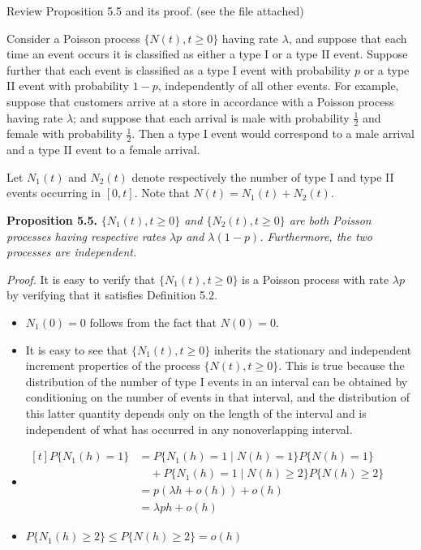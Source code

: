 \documentclass[12pt,a4paper]{article}
\begin{document}
Review Proposition 5.5 and its proof. (see the file attached)

Consider a Poisson process $\{N(t), t \ge 0\}$ having rate $\lambda$, and suppose that each time an event occurs it is classified as either a type I or a type II event. Suppose further that each event is classified as a type I event with probability $p$ or a type II event with probability $1-p$, independently of all other events. For example, suppose that customers arrive at a store in accordance with a Poisson process having rate $\lambda$; and suppose that each arrival is male with probability $\frac{1}{2}$ and female with probability $\frac{1}{2}$. Then a type I event would correspond to a male arrival and a type II event to a female arrival.

Let $N_1(t)$ and $N_2(t)$ denote respectively the number of type I and type II events occurring in $[0,t]$. Note that $N(t)=N_1(t)+N_2(t)$.

\noindent\textbf{Proposition 5.5.} \textit{$\{N_1(t), t \ge 0\}$ and $\{N_2(t), t \ge 0\}$ are both Poisson processes having respective rates $\lambda p$ and $\lambda(1-p)$. Furthermore, the two processes are independent.}

\noindent\textit{Proof.} It is easy to verify that $\{N_1(t), t \ge 0\}$ is a Poisson process with rate $\lambda p$ by verifying that it satisfies Definition 5.2.

\begin{itemize}[leftmargin=2em]
  \item $N_1(0)=0$ follows from the fact that $N(0)=0$.
  \item It is easy to see that $\{N_1(t), t \ge 0\}$ inherits the stationary and independent increment properties of the process $\{N(t), t \ge 0\}$. This is true because the distribution of the number of type I events in an interval can be obtained by conditioning on the number of events in that interval, and the distribution of this latter quantity depends only on the length of the interval and is independent of what has occurred in any nonoverlapping interval.
  \item
  $\begin{aligned}[t]
    P\{N_1(h)=1\}
      &=P\{N_1(h)=1\mid N(h)=1\}P\{N(h)=1\}\\
      &\quad+P\{N_1(h)=1\mid N(h)\ge 2\}P\{N(h)\ge 2\}\\
      &=p(\lambda h+o(h))+o(h)\\
      &=\lambda ph+o(h)
  \end{aligned}$
  \item $P\{N_1(h)\ge 2\}\le P\{N(h)\ge 2\}=o(h)$
\end{itemize}
\end{document}
